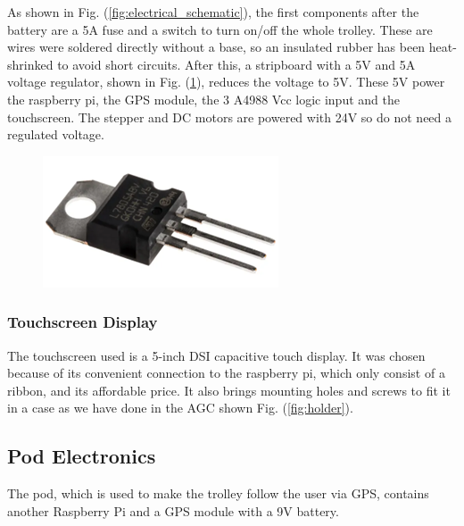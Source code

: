 \documentclass[11pt,landscape]{article}
\begin{document}
\begin{multicols}{3}
As shown in Fig. (\ref{fig:electrical_schematic}), the first components after
the battery are a 5A fuse and a switch to turn on/off the whole trolley. These
are wires were soldered directly without a base, so an insulated rubber has been
heat-shrinked to avoid short circuits. After this, a stripboard with a 5V and 5A
voltage regulator, shown in Fig. (\ref{fig:voltage_regulator}),
reduces the voltage to 5V. These 5V power the raspberry pi, the GPS module, the
3 A4988 Vcc logic input and the touchscreen. The stepper and DC motors are
powered with 24V so do not need a regulated voltage. 

\begin{figure}[H]
    \begin{center}
        \includegraphics[]{voltage_regulator}
        \label{fig:voltage_regulator}
        \end{center}
\end{figure}

\subsubsection{Touchscreen Display}
The touchscreen used is a 5-inch DSI capacitive touch display. It was chosen
because of its convenient connection to the raspberry pi, which only consist of
a ribbon, and its affordable price. It also brings mounting holes and screws to
fit it in a case as we have done in the AGC shown Fig. (\ref{fig:holder}). 

\subsection{Pod Electronics}
The pod, which is used to make the trolley follow the user via GPS, contains
another Raspberry Pi and a GPS module with a 9V battery.

\end{multicols}
\end{document}
